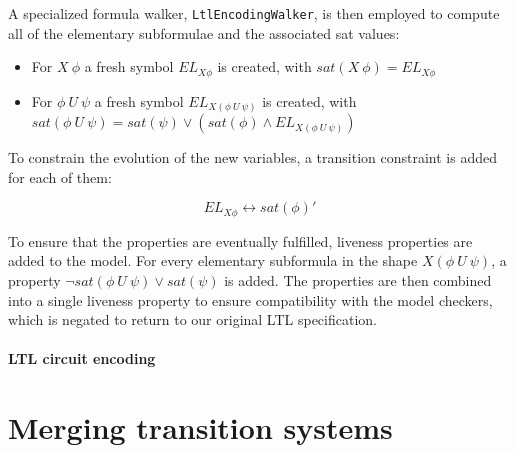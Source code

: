 A specialized formula walker, \texttt{LtlEncodingWalker}, is then employed to compute all of the elementary subformulae and the associated sat values:
\begin{itemize}
    \item For \begin{math}X\ \phi\end{math} a fresh symbol \begin{math}EL_{X \phi}\end{math} is created, with \begin{math}sat(X\ \phi) = EL_{X \phi}\end{math}
    \item For \begin{math}\phi\ U\ \psi\end{math} a fresh symbol \begin{math}EL_{X (\phi\ U\ \psi)}\end{math} is created, with \begin{math}sat(\phi\ U\ \psi) = sat(\psi) \lor (sat(\phi) \land EL_{X (\phi\ U\ \psi)})\end{math}
\end{itemize}

To constrain the evolution of the new variables, a transition constraint is added for each of them:

\[ EL_{X \phi} \leftrightarrow sat(\phi)' \]

To ensure that the properties are eventually fulfilled, liveness properties are added to the model.
For every elementary subformula in the shape \begin{math}X (\phi\ U\ \psi)\end{math}, a property \begin{math}\lnot sat(\phi\ U\ \psi) \lor sat(\psi) \end{math} is added.
The properties are then combined into a single liveness property to ensure compatibility with the model checkers, which is negated to return to our original LTL specification.


\paragraph*{LTL circuit encoding}


\section{Merging transition systems}

